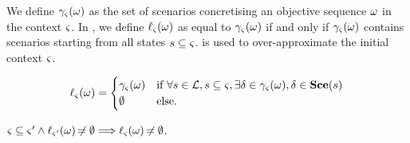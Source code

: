 We define $\gamma_\varsigma(\omega)$ as the set of scenarios concretising an objective sequence $\omega$ in the context $\varsigma$.
In , we define $\ell_\varsigma(\omega)$ as equal to $\gamma_\varsigma(\omega)$ if and only if $\gamma_\varsigma(\omega)$ contains scenarios starting from all states $s \subseteq \varsigma$.
 is used to over-approximate the initial context $\varsigma$.
%
\begin{comment}
\begin{definition}[$\concr: \OS \mapsto \powerset(\Sce)$]
\label{def:concr}
\towrite{Simplifier ? Supprimer la def formelle ?}
  For a given $\w \in \OS$, $\concr(\w)$ is the set of scenarios concretising $\w$ in the context $\ctx$:
  \begin{align*}
    \concr(\w) = \{ \delta \in \Sce \mid & (\w^\vartriangle = \emptyseq \wedge \delta = \emptyseq) 
      \vee (\w^\vartriangle \neq \emptyseq \wedge \supp(\delta) \subseteq \ctx
    \\ &
      \wedge \exists \phi:\indexes{\w} \mapsto \indexes{\delta}, (\forall n, m \in \indexes{\w}, n < m \Leftrightarrow \phi(n) \leq \phi(m)) 
    \\ &
      \wedge \forall n \in \indexes{\w}, \PHbounce(\w_n) \in \ctx \PHplay \delta_{1..\phi(n)})
    \}
    \enspace,
  \end{align*}
  where $\omega^\vartriangle$ refers to the sequence of objectives $\omega$ where the trivial objectives have been removed.
\end{definition}
%
\begin{definition}[$\concr: \powerset(\OS) \mapsto \powerset(\Sce)$]
\label{def:concr-set}
  $\concr(\W) = \{ \delta \in \concr(\w) \mid \w \in \W \} \enspace.$
\end{definition}
\end{comment}
%
\begin{definition}[$\uconcr: \OS \rightarrow \powerset(\Sce)$]
\label{def:uconcr}
  \[
  \ell_\varsigma(\omega) = 
  \begin{cases}
    \gamma_\varsigma(\omega) & \text{if } \forall s \in \mathcal{L}, s \subseteq \varsigma, \exists \delta \in \gamma_\varsigma(\omega), \delta \in \mathbf{Sce}(s) \\
    \emptyset & \text{else.}
  \end{cases}
  \]
\end{definition}
% 
\begin{theorem}
\label{th:uconcr-ctx}
  $\varsigma \subseteq \varsigma' \wedge \ell_{\varsigma'}(\omega) \not\nobreak\mkern -2mu = \emptyset \Longrightarrow \ell_{\varsigma}(\omega) \not\nobreak\mkern -2mu = \emptyset$.
\end{theorem}

